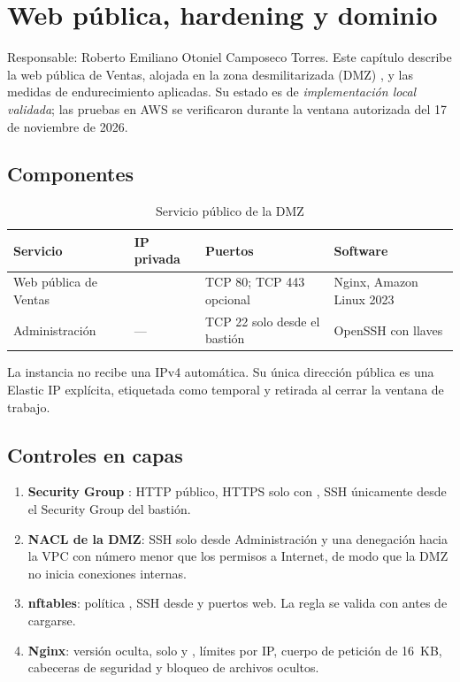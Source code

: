 \chapter{Web pública, hardening y dominio}

Responsable: Roberto Emiliano Otoniel Camposeco Torres. Este capítulo describe la web pública
de Ventas, alojada en la zona desmilitarizada (DMZ) , y las medidas de
endurecimiento aplicadas. Su estado es de \emph{implementación local validada}; las pruebas en
AWS se verificaron durante la ventana autorizada del 17 de noviembre de 2026.

\section{Componentes}

\begin{table}[H]
\centering
\caption{Servicio público de la DMZ}
\small
\begin{tabularx}{\textwidth}{>{\raggedright\arraybackslash}p{3.3cm}p{2.6cm}p{3.4cm}Y}
\toprule
\textbf{Servicio} & \textbf{IP privada} & \textbf{Puertos} & \textbf{Software} \\
\midrule
Web pública de Ventas &  & TCP 80; TCP 443 opcional & Nginx, Amazon Linux 2023 \\
Administración & --- & TCP 22 solo desde el bastión & OpenSSH con llaves \\
\bottomrule
\end{tabularx}
\end{table}

La instancia no recibe una IPv4 automática. Su única dirección pública es una Elastic IP
explícita, etiquetada como temporal y retirada al cerrar la ventana de trabajo.

\section{Controles en capas}

\begin{enumerate}
  \item \textbf{Security Group} : HTTP público, HTTPS solo con
    , SSH únicamente desde el Security Group del bastión.
  \item \textbf{NACL de la DMZ}: SSH solo desde Administración y una denegación hacia la VPC con
    número menor que los permisos a Internet, de modo que la DMZ no inicia conexiones internas.
  \item \textbf{nftables}: política , SSH desde  y puertos web.
    La regla se valida con  antes de cargarse.
  \item \textbf{Nginx}: versión oculta, solo  y , límites por IP, cuerpo de
    petición de 16~KB, cabeceras de seguridad y bloqueo de archivos ocultos.
\end{enumerate}

